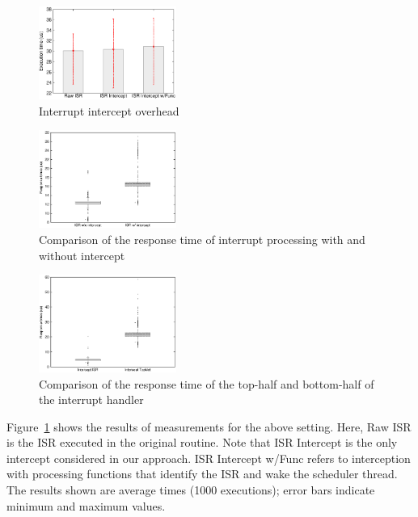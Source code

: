 \begin{figure}[t]
\begin{center}
\includegraphics[width=0.4\textwidth]{img/interrupt}
\caption{Interrupt intercept overhead}
\label{fig:irq_overhead}
\end{center}
\end{figure}
\begin{figure}[t]
\begin{center}
\includegraphics[width=0.4\textwidth]{img/interrupt_response}
\caption{Comparison of the response time of interrupt processing with and without intercept}
\label{fig:response}
\end{center}
\end{figure}
\begin{figure}[t]
\begin{center}
\includegraphics[width=0.4\textwidth]{img/tasklet_vs_interrupt}
\caption{Comparison of the response time of the top-half and bottom-half of the interrupt handler}
\label{fig:bottomvstasklet}
\end{center}
\end{figure}

Figure~\ref{fig:irq_overhead} shows the results of measurements for the above setting.
Here, Raw ISR is the ISR executed in the original routine.
Note that ISR Intercept is the only intercept considered in our approach.
ISR Intercept w/Func refers to interception with processing functions that identify the ISR and wake the scheduler thread.
The results shown are average times (1000 executions); error bars indicate minimum and maximum values.

